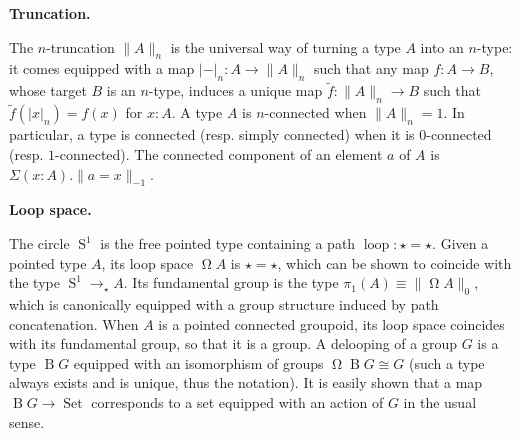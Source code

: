  
 
 
\par\medskip\noindent\textbf{Truncation.}\par
 
 
The $n$-truncation $\|A\|_{n}$ is the universal way of turning a type $A$ into an $n$-type: it comes equipped with a map $|{-}|_{n}:A\to\|A\|_{n}$ such that any map $f:A\to B$, whose target $B$ is an $n$-type, induces a unique map $\tilde{f}:\|A\|_{n}\to B$ such that $\tilde{f}(|x|_{n})=f(x)$ for $x:A$. A type $A$ is $n$-connected when $\|A\|_{n}=1$. In particular, a type is connected (resp. simply connected) when it is $0$-connected (resp. $1$-connected). The connected component of an element $a$ of $A$ is $\Sigma(x:A).\|a=x\|_{-1}$.\par
 
 
 
 
\par\medskip\noindent\textbf{Loop space.}\par
 
 
The circle $\operatorname{S}^{1}$ is the free pointed type containing a path $\operatorname{loop}:\star=\star$. Given a pointed type $A$, its loop space $\operatorname{\Omega}A$ is $\star=\star$, which can be shown to coincide with the type $\operatorname{S}^{1}\to_{\star{}}A$. Its fundamental group is the type $\pi_{1}(A)\equiv\|\operatorname{\Omega}A\|_{0}$, which is canonically equipped with a group structure induced by path concatenation. When $A$ is a pointed connected groupoid, its loop space coincides with its fundamental group, so that it is a group. A delooping of a group $G$ is a type $\operatorname{B}G$ equipped with an isomorphism of groups $\operatorname{\Omega}\operatorname{B}G\cong G$ (such a type always exists and is unique, thus the notation). It is easily shown that a map $\operatorname{B}G\to\operatorname{Set}$ corresponds to a set equipped with an action of $G$ in the usual sense.\par
 
 
 
